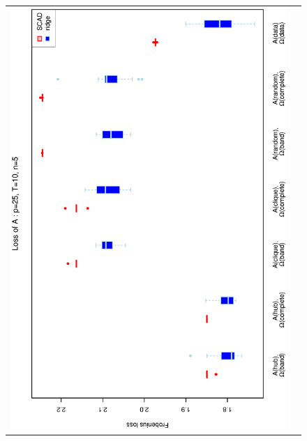 \begin{figure}[h!]
\centering
\begin{tabular}{cc}
\includegraphics[scale=0.45,angle=270]{LossA25T10N5_5.eps}
\\

\end{tabular}
\end{figure}
